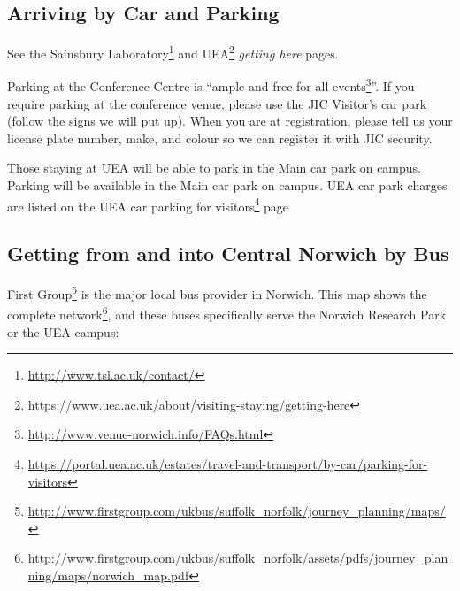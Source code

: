 \documentclass[12pt,]{book}
\let\rmarkdownfootnote\footnote%
\def\footnote{\protect\rmarkdownfootnote}
\renewcommand{\href}[2]{#2\footnote{\url{#1}}}
\begin{document}
\subsection*{Arriving by Car and
Parking}\label{arriving-by-car-and-parking}

See the \href{http://www.tsl.ac.uk/contact/}{Sainsbury Laboratory} and
\href{https://www.uea.ac.uk/about/visiting-staying/getting-here}{UEA}
\emph{getting here} pages.

Parking at the Conference Centre is
``\href{http://www.venue-norwich.info/FAQs.html}{ample and free for all
events}''. If you require parking at the conference venue, please use
the JIC Visitor's car park (follow the signs we will put up). When you
are at registration, please tell us your license plate number, make, and
colour so we can register it with JIC security.

Those staying at UEA will be able to park in the Main car park on
campus. Parking will be available in the Main car park on campus. UEA
car park charges are listed on the
\href{https://portal.uea.ac.uk/estates/travel-and-transport/by-car/parking-for-visitors}{UEA
car parking for visitors} page

\subsection*{Getting from and into Central Norwich by
Bus}\label{getting-from-and-into-central-norwich-by-bus}

\href{http://www.firstgroup.com/ukbus/suffolk_norfolk/journey_planning/maps/}{First
Group} is the major local bus provider in Norwich.
\href{http://www.firstgroup.com/ukbus/suffolk_norfolk/assets/pdfs/journey_planning/maps/norwich_map.pdf}{This
map shows the complete network}, and these buses specifically serve the
Norwich Research Park or the UEA campus:
\end{document}
